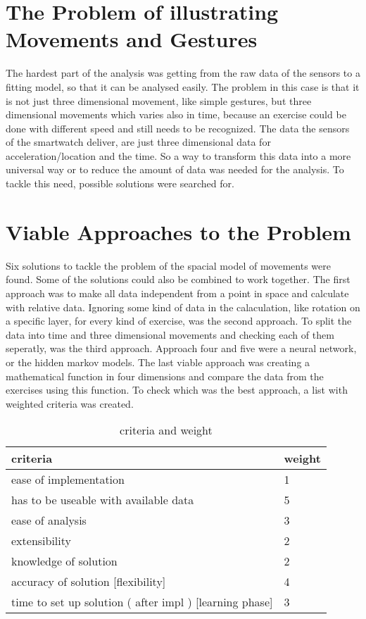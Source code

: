 
\section{The Problem of illustrating Movements and Gestures}

The hardest part of the analysis was getting from the raw data of the sensors to a fitting model, so that it can be analysed easily. The problem in this case is that it is not just three 	dimensional movement, like simple gestures, but three dimensional movements which varies also in time, because an exercise could be done with different speed and still needs to be recognized. The data the sensors of the smartwatch deliver, are just three dimensional data for acceleration/location and the time. So a way to transform this data into a more universal way or to reduce the amount of data was needed for the analysis. To tackle this need, possible solutions were searched for.

\section{Viable Approaches to the Problem}

Six solutions to tackle the problem of the spacial model of movements were found. Some of the solutions could also be combined to work together. The first approach was to make all data independent from a point in space and calculate with relative data. Ignoring some kind of data in the calaculation, like rotation on a specific layer, for every kind of exercise, was the second approach. To split the data into time and three dimensional movements and checking each of them seperatly, was the third approach. Approach four and five were a neural network, or the hidden markov models. The last viable approach was creating a mathematical function in four dimensions and compare the data from the exercises using this function.
\newline
\newline
To check which was the best approach, a list with weighted criteria was created.

\begin{table}[h]
\begin{tabular}{|l|l|}
\hline
	\textbf{criteria} & \textbf{weight} \\
\hline
	ease of implementation & 1\\
\hline
	has to be useable with available data & 5\\
\hline
	ease of analysis & 3\\
\hline
	extensibility & 2\\
\hline
	knowledge of solution & 2\\
\hline
	accuracy of solution [flexibility] & 4\\
\hline
	time to set up solution ( after impl )
[learning phase] & 3\\
\hline

\end{tabular}
\caption{ criteria and weight  }
\end{table}

